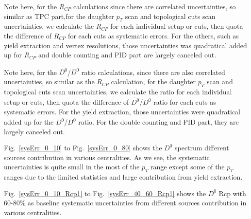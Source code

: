 Note here, for the $R_{CP}$ calculations since there are correlated uncertainties, so similar as TPC part,for the daughter $p_T$ scan and topological cuts scan uncertainties, we calculate the $R_{CP}$ for each individual setup or cuts, then quota the difference of $R_{CP}$ for each cuts as systematic errors. For the others, such as yield extraction and vertex resolutions, those uncertainties was quadratical added up for $R_{CP}$ and double counting and PID part are largely canceled out.

Note here, for the $\bar{D^{0}}$/$D^{0}$ ratio calculations, since there are also correlated uncertainties, so similar as the $R_{CP}$ calculation, for the daughter $p_T$ scan and topological cuts scan uncertainties, we calculate the ratio for each individual setup or cuts, then quota the difference of $\bar{D^{0}}$/$D^{0}$ ratio for each cuts as systematic errors. For the yield extraction, those uncertainties were quadratical added up for the $\bar{D^{0}}$/$D^{0}$ ratio. For the double counting and PID part, they are largely canceled out.

Fig.~\ref{sysErr_0_10} to Fig.~\ref{sysErr_0_80} shows the $D^0$ spectrum different sources contribution in various centralities. As we see, the systematic uncertainties is quite small in the most of the $p_T$ range except some of the $p_T$ ranges due to the limited statistics and large contribution from yield extraction.

Fig.~\ref{sysErr_0_10_Rcp1} to Fig.~\ref{sysErr_40_60_Rcp1} shows the $D^0$ Rcp with 60-80\% as baseline systematic uncertainties from different sources contribution in various centralities. 

